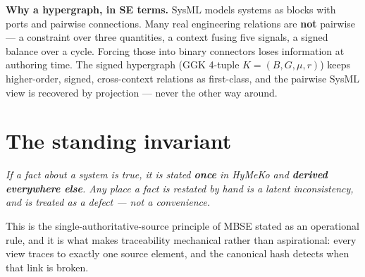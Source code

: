 \documentclass[11pt]{article}
\newenvironment{quotebox}{\begin{center}\begin{minipage}{0.92\textwidth}\itshape\color{black!75}}{\end{minipage}\end{center}}
\begin{document}
\textbf{Why a hypergraph, in SE terms.} SysML models systems as blocks with ports and pairwise
connections. Many real engineering relations are \textbf{not} pairwise --- a constraint over three
quantities, a context fusing five signals, a signed balance over a cycle. Forcing those into binary
connectors loses information at authoring time. The signed hypergraph (GGK 4-tuple
$K=(B,G,\mu,r)$) keeps higher-order, signed, cross-context relations as first-class, and the pairwise
SysML view is recovered by projection --- never the other way around.

\section{The standing invariant}
\begin{quotebox}
If a fact about a system is true, it is stated \textbf{once} in HyMeKo and \textbf{derived everywhere
else}. Any place a fact is restated by hand is a latent inconsistency, and is treated as a defect ---
not a convenience.
\end{quotebox}
This is the single-authoritative-source principle of MBSE stated as an operational rule, and it is
what makes traceability mechanical rather than aspirational: every view traces to exactly one source
element, and the canonical hash detects when that link is broken.
\end{document}
